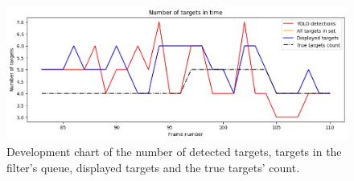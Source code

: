 \begin{figure}[H]
    \centering
    \includegraphics[width=\linewidth]{../../../experiments/E1/V2/YOLO/yolo_det}
    \caption{Development chart of the number of detected targets, targets in the filter's queue, displayed targets
    and the
    true targets' count.}
    \label{gr:E1-V2-S1}
\end{figure}

